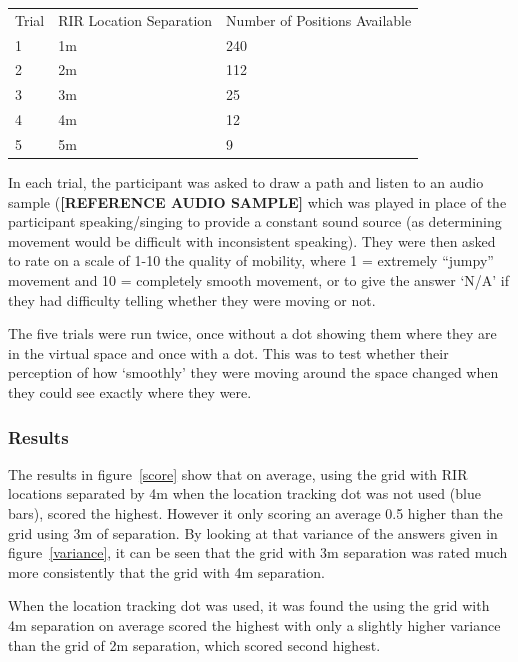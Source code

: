 \documentclass[../../main.tex]{subfiles}
\begin{document}
				\begin{center}
					\begin{tabu} to 0.9\textwidth{X[1,c] X[2,c] X[2,c]}
					Trial & \ac{RIR} Location Separation & Number of Positions Available \\
						1 & 1m & 240 \\
						2 & 2m & 112 \\
						3 & 3m & 25 \\
						4 & 4m & 12 \\
						5 & 5m & 9 \\
					\end{tabu}
				\end{center}
				\vspace{5mm}
				In each trial, the participant was asked to draw a path and listen to an audio sample \cite{trumpet} (\textbf{[REFERENCE AUDIO SAMPLE]} which was played in place of the participant speaking/singing to provide a constant sound source (as determining movement would be difficult with inconsistent speaking). They were then asked to rate on a scale of 1-10 the quality of mobility, where 1 = extremely ``jumpy'' movement and 10 = completely smooth movement, or to give the answer `N/A' if they had difficulty telling whether they were moving or not.

				The five trials were run twice, once without a dot showing them where they are in the virtual space and once with a dot. This was to test whether their perception of how `smoothly' they were moving around the space changed when they could see exactly where they were.

			\subsubsection{Results}

				The results in figure~\ref{score} show that on average, using the grid with \ac{RIR} locations separated by 4m when the location tracking dot was not used (blue bars), scored the highest. However it only scoring an average 0.5 higher than the grid using 3m of separation. By looking at that variance of the answers given in figure~\ref{variance}, it can be seen that the grid with 3m separation was rated much more consistently that the grid with 4m separation.

				When the location tracking dot was used, it was found the using the grid with 4m separation on average scored the highest with only a slightly higher variance than the grid of 2m separation, which scored second highest.
\end{document}
